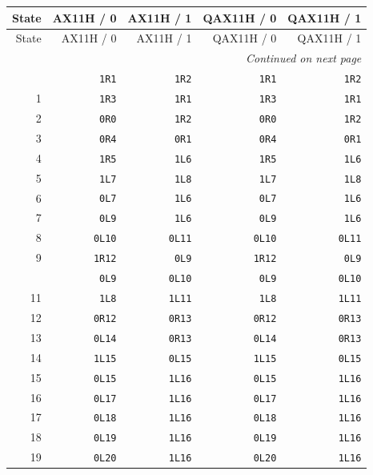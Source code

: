 \small
\begin{longtable}{@{}r r r r r@{}}
\toprule
State & AX11H / 0 & AX11H / 1 & QAX11H / 0 & QAX11H / 1\\
\midrule\endfirsthead
\toprule
State & AX11H / 0 & AX11H / 1 & QAX11H / 0 & QAX11H / 1\\
\midrule\endhead
\midrule\multicolumn{5}{r}{\emph{Continued on next page}}\\\endfoot
\bottomrule\endlastfoot
0 & \texttt{1R1} & \texttt{1R2} & \texttt{1R1} & \texttt{1R2}\\
1 & \texttt{1R3} & \texttt{1R1} & \texttt{1R3} & \texttt{1R1}\\
2 & \texttt{0R0} & \texttt{1R2} & \texttt{0R0} & \texttt{1R2}\\
3 & \texttt{0R4} & \texttt{0R1} & \texttt{0R4} & \texttt{0R1}\\
4 & \texttt{1R5} & \texttt{1L6} & \texttt{1R5} & \texttt{1L6}\\
5 & \texttt{1L7} & \texttt{1L8} & \texttt{1L7} & \texttt{1L8}\\
6 & \texttt{0L7} & \texttt{1L6} & \texttt{0L7} & \texttt{1L6}\\
7 & \texttt{0L9} & \texttt{1L6} & \texttt{0L9} & \texttt{1L6}\\
8 & \texttt{0L10} & \texttt{0L11} & \texttt{0L10} & \texttt{0L11}\\
9 & \texttt{1R12} & \texttt{0L9} & \texttt{1R12} & \texttt{0L9}\\
\addlinespace[3pt]
10 & \texttt{0L9} & \texttt{0L10} & \texttt{0L9} & \texttt{0L10}\\
11 & \texttt{1L8} & \texttt{1L11} & \texttt{1L8} & \texttt{1L11}\\
12 & \texttt{0R12} & \texttt{0R13} & \texttt{0R12} & \texttt{0R13}\\
13 & \texttt{0L14} & \texttt{0R13} & \texttt{0L14} & \texttt{0R13}\\
14 & \texttt{1L15} & \texttt{0L15} & \texttt{1L15} & \texttt{0L15}\\
15 & \texttt{0L15} & \texttt{1L16} & \texttt{0L15} & \texttt{1L16}\\
16 & \texttt{0L17} & \texttt{1L16} & \texttt{0L17} & \texttt{1L16}\\
17 & \texttt{0L18} & \texttt{1L16} & \texttt{0L18} & \texttt{1L16}\\
18 & \texttt{0L19} & \texttt{1L16} & \texttt{0L19} & \texttt{1L16}\\
19 & \texttt{0L20} & \texttt{1L16} & \texttt{0L20} & \texttt{1L16}\\

\end{longtable}
